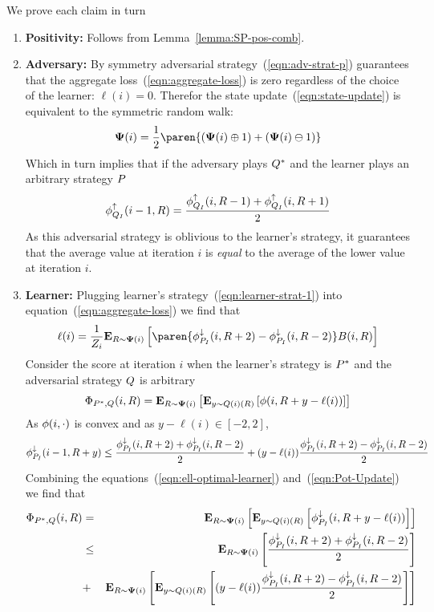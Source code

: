 \documentclass{article}[12pt]
\begin{document}
\proof We prove each claim in turn
\begin{enumerate}
\item {\bf Positivity:} Follows from Lemma~\ref{lemma:SP-pos-comb}.
\item{\bf Adversary:} By symmetry adversarial strategy~(\ref{eqn:adv-strat-p}) guarantees that
  the aggregate loss~(\ref{eqn:aggregate-loss}) is zero regardless of
  the choice of the learner: $\ell(i)=0$.
  Therefor the state update~(\ref{eqn:state-update}) is equivalent to
  the symmetric random walk:
  $$\state(i) = \frac{1}{2} \paren{(\state(i) \oplus 1) + (\state(i)
    \ominus 1)}$$
  Which in turn implies that if the adversary plays $Q^*$
  and the learner plays an arbitrary strategy $P$
  \begin{equation} \label{eqn:lower}
    \phi_{Q_I}^{\uparrow}(i-1,R) = \frac{\phi_{Q_I}^{\uparrow}(i,R-1)+\phi_{Q_I}^{\uparrow}(i,R+1)}{2}
  \end{equation}
  As this adversarial strategy is oblivious to the learner's strategy, it
  guarantees that the average value at iteration $i$ is {\em equal} to the
  average of the lower value at iteration $i$.
\item {\bf Learner:}
  Plugging learner's strategy~(\ref{eqn:learner-strat-1})
  into equation~(\ref{eqn:aggregate-loss}) we find that
 \begin{equation} \label{eqn:ell-optimal-learner}
   \ell(i) = \frac{1}{Z_{i}} \E{\R \sim \state(i)}{\paren{\upperpotb(i,\R+2)-\upperpotb(i,\R-2)}
   \Bias(i,\R)}
\end{equation}
  Consider the score at iteration $i$ when the learner's strategy
  is $P^*$ and the adversarial strategy  $Q$ is arbitrary
     \begin{equation} \label{eqn:Pot-Update}
    \Phi_{P^*,Q}(i,R) = {\bf E}_{R \sim {\bf \Psi}(i)}\left[  {\bf E}_{y \sim
      Q(i)(R)}\left[ \phi(i,R+y-\ell(i)) \right] \right]
  \end{equation}
  As $\phi(i,\cdot)$ is convex and as $y-\ell(i) \in [-2,2]$,
  \begin{equation} \label{eqn:pot-upper}
    \phi_{P_I}^{\downarrow}(i-1,R+y) \leq \frac{\phi_{P_I}^{\downarrow}(i,R+2)+\phi_{P_I}^{\downarrow}(i,R-2)}{2} +
    (y-\ell(i)) \frac{\phi_{P_I}^{\downarrow}(i,R+2)-\phi_{P_I}^{\downarrow}(i,R-2)}{2}
    \end{equation}
  Combining the equations~(\ref{eqn:ell-optimal-learner}) and~(\ref{eqn:Pot-Update}) we find that
  \begin{eqnarray}
  \Phi_{P^*,Q}(i,R)&=&{\bf E}_{R \sim {\bf \Psi}(i)}\left[ {\bf E}_{y \sim Q(i)(R)}\left[ \phi_{P_I}^{\downarrow}(i,R+y-\ell(i)) \right] \right]\\
  &\leq & {\bf E}_{R \sim {\bf \Psi}(i)}\left[ \frac{\phi_{P_I}^{\downarrow}(i,R+2)+\phi_{P_I}^{\downarrow}(i,R-2)}{2} \right]\\
  &+&
  {\bf E}_{R \sim {\bf \Psi}(i)}\left[ {\bf E}_{y \sim Q(i)(R)}\left[ (y-\ell(i)) \frac{\phi_{P_I}^{\downarrow}(i,R+2)-\phi_{P_I}^{\downarrow}(i,R-2)}{2} \right] \right] \label{eqn:zero-term}
  \end{eqnarray}
  

\end{enumerate}
\end{document}
